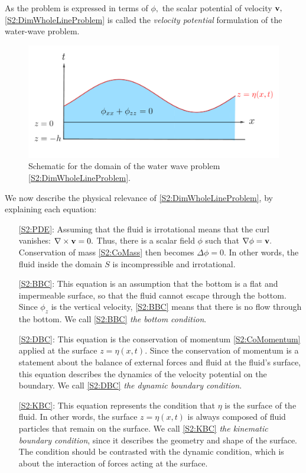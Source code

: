 As the problem is expressed in terms of $\phi,$ the scalar potential of velocity ${\bf v},$ \eqref{S2:DimWholeLineProblem} is called the \textit{velocity potential} formulation of the water-wave problem.
\begin{figure}[h]
\captionsetup{width=\textwidth}
\centering
\includegraphics[width=\linewidth]{figures/waterwaveproblem.pdf}
\caption{Schematic for the domain of the water wave problem \eqref{S2:DimWholeLineProblem}.}
\label{fig:waterwaveproblem}
\end{figure}

We now describe the physical relevance of \eqref{S2:DimWholeLineProblem}, by explaining each equation:
\begin{itemize}
\item[\eqref{S2:PDE}:] Assuming that the fluid is irrotational means that the curl vanishes: $\nabla \times {\bf v} = 0.$ Thus, there is a scalar field $\phi$ such that $\nabla \phi = {\bf v}.$ Conservation of mass \eqref{S2:CoMass} then becomes $\Delta \phi = 0.$ In other words, the fluid inside the domain $S$ is incompressible and irrotational.
\item[\eqref{S2:BBC}:] This equation is an assumption that the bottom is a flat and impermeable surface, so that the fluid cannot escape through the bottom. Since $\phi_z$ is the vertical velocity, \eqref{S2:BBC} means that there is no flow through the bottom. We call \eqref{S2:BBC} \textit{the bottom condition}. 
\item[\eqref{S2:DBC}:] This equation is the conservation of momentum \eqref{S2:CoMomentum} applied at the surface $z = \eta(x,t).$ Since the conservation of momentum is a statement about the balance of external forces and fluid at the fluid's surface, this equation describes the dynamics of the velocity potential on the boundary. We call \eqref{S2:DBC} \textit{the dynamic boundary condition}.
\item[\eqref{S2:KBC}:] This equation represents the condition that $\eta$ is the surface of the fluid. In other words, the surface $z = \eta(x,t)$ is always composed of fluid particles that remain on the surface. We call \eqref{S2:KBC} \textit{the kinematic boundary condition}, since it describes the geometry and shape of the surface. The condition should be contrasted with the dynamic condition, which is about the interaction of forces acting at the surface. 
\end{itemize}

